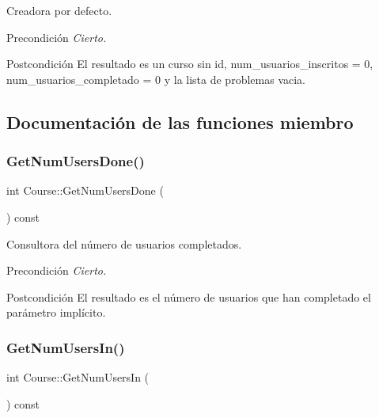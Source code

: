 Creadora por defecto. 

\begin{DoxyPrecond}{Precondición}
{\itshape Cierto.} 
\end{DoxyPrecond}
\begin{DoxyPostcond}{Postcondición}
El resultado es un curso sin id, num\+\_\+usuarios\+\_\+inscritos = 0, num\+\_\+usuarios\+\_\+completado = 0 y la lista de problemas vacia. 
\end{DoxyPostcond}


\subsection{Documentación de las funciones miembro}
\mbox{\label{class_course_ad17501c45b744c632235c05365f05f1d}} 
\subsubsection{\texorpdfstring{Get\+Num\+Users\+Done()}{GetNumUsersDone()}}
{\footnotesize\ttfamily int Course\+::\+Get\+Num\+Users\+Done (\begin{DoxyParamCaption}{ }\end{DoxyParamCaption}) const}



Consultora del número de usuarios completados. 

\begin{DoxyPrecond}{Precondición}
{\itshape Cierto.} 
\end{DoxyPrecond}
\begin{DoxyPostcond}{Postcondición}
El resultado es el número de usuarios que han completado el parámetro implícito. 
\end{DoxyPostcond}
\mbox{\label{class_course_a3ce2bc364698f6857385d7bb0ea82812}} 
\subsubsection{\texorpdfstring{Get\+Num\+Users\+In()}{GetNumUsersIn()}}
{\footnotesize\ttfamily int Course\+::\+Get\+Num\+Users\+In (\begin{DoxyParamCaption}{ }\end{DoxyParamCaption}) const}



